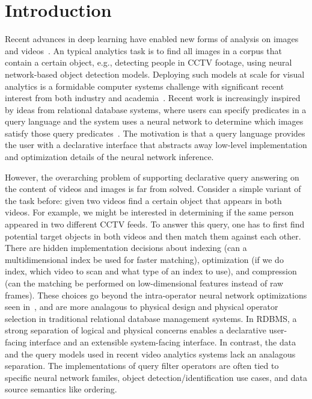\section{Introduction}\label{intro}\sloppy
Recent advances in deep learning have enabled new forms of analysis on images and videos~\cite{lecun2015deep}. 
An typical analytics task is to find all images in a corpus that contain a certain object, e.g., detecting people in CCTV footage, using neural network-based object detection models.  
Deploying such models at scale for visual analytics is a formidable computer systems challenge with significant recent interest from both industry and academia~\cite{kang2017noscope, anderson2018predicate, kang2018blazeit, chetlur2014cudnn, fengeva, zhang2018ffs, anderson2018physical, jiang2018mainstream, jiang2018chameleon}. 
Recent work is increasingly inspired by ideas from relational database systems, where users can specify predicates in a query language and the system uses a neural network to determine which images satisfy those query predicates~\cite{kang2018blazeit,wu2018querying}.
The motivation is that a query language provides the user with a declarative interface that abstracts away low-level implementation and optimization details of the neural network inference.

However, the overarching problem of supporting declarative query answering on the content of videos and images is far from solved. 
Consider a simple variant of the task before: given two videos find a certain object that appears in both videos. For example, we might be interested in determining if the same person appeared in two different CCTV feeds. To answer this query, one has to first find potential target objects in both videos and then match them against each other. There are hidden implementation decisions about indexing (can a multidimensional index be used for faster matching), optimization (if we do index, which video to scan and what type of an index to use), and compression (can the matching be performed on low-dimensional features instead of raw frames). These choices go beyond the intra-operator neural network optimizations seen in~\cite{kang2017noscope, zhang2018ffs, anderson2018physical, jiang2018chameleon}, and are more analagous to physical design and physical operator selection in traditional relational database management systems. In RDBMS, a strong separation of logical and physical concerns enables a declarative user-facing interface and an extensible system-facing interface. In contrast, the data and the query models used in recent video analytics systems lack an analagous separation. The implementations of query filter operators are often tied to specific neural network familes, object detection/identification use cases, and data source semantics like ordering.

